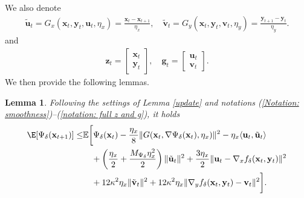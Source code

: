 \documentclass[11pt]{article}
\def\vg{\mathbf{g}}
\def\vu{\mathbf{u}}
\def\vv{\mathbf{v}}
\def\vx{\mathbf{x}}
\def\vy{\mathbf{y}}
\def\vz{\mathbf{z}}
\newtheorem{lemma}{Lemma}
\begin{document}
We also denote
\begin{align}\label{notation: simplify of the gradient mapping}
    \tilde{\vu}_t=G_x(\vx_t, \vy_t,\vu_t,\eta_x) = \frac{\vx_t-\vx_{t+1}}{\eta_x},
\quad
\tilde{\vv}_t=G_y(\vx_t, \vy_t,\vv_t,\eta_y) = \frac{\vy_{t+1} - \vy_t}{\eta_y}.
\end{align}
and
\begin{align}\label{notation: full z and g}
    \vz_t=
\begin{bmatrix}
    \vx_t\\
    \vy_t
\end{bmatrix},
\quad
\vg_t=
\begin{bmatrix}
    \vu_t\\
    \vv_t
\end{bmatrix}.
\end{align}
We then provide the following lemmas.


\begin{lemma}\label{lemma:C.1}
    Following the settings of Lemma \ref{update} and notations (\ref{Notation: smoothness})--(\ref{notation: full z and g}),  it holds
\begin{align}\label{eq:varphi}
\begin{split}
\E[\Psi_\delta(\vx_{t+1})]
\le &
\mathbb{E}  \bigg[\Psi_{\delta}(  \vx_t) -\frac{\eta_x}{8}\Vert G(\vx_t,\nabla\Psi_\delta(\vx_t),\eta_x) \Vert^2-\eta_x\langle \vu_t, \tilde{\vu}_t\rangle \\
& \quad + \left(\frac{\eta_x}{2}+\frac{M_{\Psi_\delta}  \eta_x^2 }{2}\right) \Vert   \tilde{\vu}_t\Vert^2
+\frac{3\eta_x}{2} \|\vu_t-\nabla_x f_\delta(\vx_t,\vy_t)\|^2 \\
& \quad + 12\kappa^2\eta_x\|\tilde{\vv}_t\|^2 + 12\kappa^2\eta_x\|\nabla_y f_\delta(\vx_t,\vy_t)-\vv_t\|^2\bigg].
\end{split}
\end{align}
\end{lemma}
\end{document}
